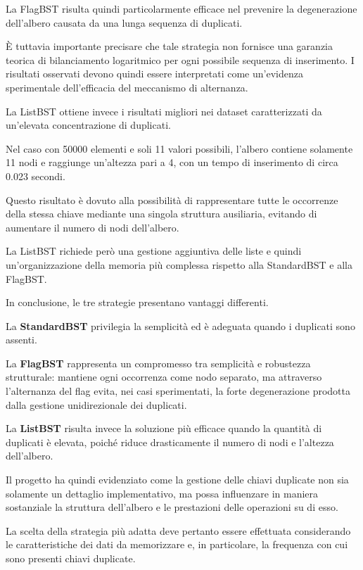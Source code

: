 \documentclass[a4paper,12pt]{article}
\begin{document}
La FlagBST risulta quindi particolarmente efficace nel prevenire la degenerazione dell'albero causata da una lunga sequenza di duplicati.

È tuttavia importante precisare che tale strategia non fornisce una garanzia teorica di bilanciamento logaritmico per ogni possibile sequenza di inserimento. I risultati osservati devono quindi essere interpretati come un'evidenza sperimentale dell'efficacia del meccanismo di alternanza.

La ListBST ottiene invece i risultati migliori nei dataset caratterizzati da un'elevata concentrazione di duplicati.

Nel caso con 50000 elementi e soli 11 valori possibili, l'albero contiene solamente 11 nodi e raggiunge un'altezza pari a 4, con un tempo di inserimento di circa 0.023 secondi.

Questo risultato è dovuto alla possibilità di rappresentare tutte le occorrenze della stessa chiave mediante una singola struttura ausiliaria, evitando di aumentare il numero di nodi dell'albero.

La ListBST richiede però una gestione aggiuntiva delle liste e quindi un'organizzazione della memoria più complessa rispetto alla StandardBST e alla FlagBST.

In conclusione, le tre strategie presentano vantaggi differenti.

La \textbf{StandardBST} privilegia la semplicità ed è adeguata quando i duplicati sono assenti.

La \textbf{FlagBST} rappresenta un compromesso tra semplicità e robustezza strutturale: mantiene ogni occorrenza come nodo separato, ma attraverso l'alternanza del flag evita, nei casi sperimentati, la forte degenerazione prodotta dalla gestione unidirezionale dei duplicati.

La \textbf{ListBST} risulta invece la soluzione più efficace quando la quantità di duplicati è elevata, poiché riduce drasticamente il numero di nodi e l'altezza dell'albero.

Il progetto ha quindi evidenziato come la gestione delle chiavi duplicate non sia solamente un dettaglio implementativo, ma possa influenzare in maniera sostanziale la struttura dell'albero e le prestazioni delle operazioni su di esso.

La scelta della strategia più adatta deve pertanto essere effettuata considerando le caratteristiche dei dati da memorizzare e, in particolare, la frequenza con cui sono presenti chiavi duplicate.
\end{document}
